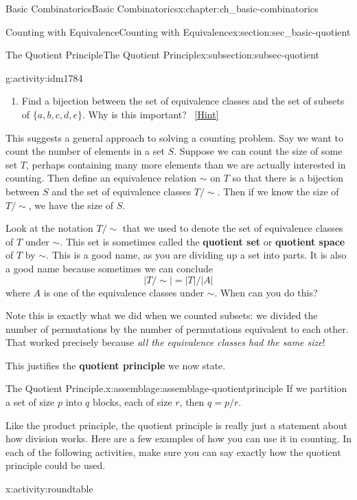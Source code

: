 \documentclass[oneside,10pt,]{book}
\newcommand{\terminology}[1]{\textbf{#1}}
\numberwithin{equation}{chapter}
\begin{document}
\begin{chapterptx}{Basic Combinatorics}{}{Basic Combinatorics}{}{}{x:chapter:ch_basic-combinatorics}
\begin{sectionptx}{Counting with Equivalence}{}{Counting with Equivalence}{}{}{x:section:sec_basic-quotient}
\begin{subsectionptx}{The Quotient Principle}{}{The Quotient Principle}{}{}{x:subsection:subsec-quotient}
\begin{activity}{}{g:activity:idm1784}
\begin{enumerate}[font=\bfseries,label=(\alph*),ref=\alph*]
\item{}Find a bijection between the set of equivalence classes and the set of subsets of \(\{a,b,c,d,e\}\).  Why is this important?%
\qquad~\hfill{\tiny\hyperlink{g:hint:idm1812-back}{[Hint]}}\end{enumerate}
\end{activity}
This suggests a general approach to solving a counting problem.  Say we want to count the number of elements in a set \(S\).  Suppose we can count the size of some set \(T\), perhaps containing many more elements than we are actually interested in counting.  Then define an equivalence relation \(\sim\) on \(T\) so that there is a bijection between \(S\) and the set of equivalence classes \(T/\sim\).  Then if we know the size of \(T/\sim\), we have the size of \(S\).%
\par
Look at the notation \(T/\sim\) that we used to denote the set of equivalence classes of \(T\) under \(\sim\).  This set is sometimes called the \terminology{quotient set} or \terminology{quotient space} of \(T\) by \(\sim\).  This is a good name, as you are dividing up a set into parts.  It is also a good name because sometimes we can conclude%
\begin{equation*}
|T/\sim| = |T|/|A|
\end{equation*}
where \(A\) is one of the equivalence classes under \(\sim\).  When can you do this?%
\par
Note this is exactly what we did when we counted subsets: we divided the number of permutations by the number of permutations equivalent to each other.  That worked precisely because \emph{all the equivalence classes had the same size}!%
\par
This justifies the \terminology{quotient principle} we now state.%
\begin{assemblage}{The Quotient Principle.}{x:assemblage:assemblage-quotientprinciple}%
If we partition a set of size \(p\) into \(q\) blocks, each of size \(r\), then \(q = p/r\).%
\end{assemblage}
Like the product principle, the quotient principle is really just a statement about how division works.  Here are a few examples of how you can use it in counting.  In each of the following activities, make sure you can say exactly how the quotient principle could be used.%
\begin{activity}{}{x:activity:roundtable}%

\end{activity}
\end{subsectionptx}
\end{sectionptx}
\end{chapterptx}
\end{document}
